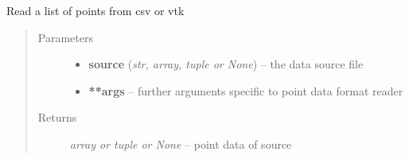 \documentclass[letterpaper,10pt,english]{sphinxmanual}
\begin{document}
\begin{fulllineitems}
\label{api/ClearMap.IO:ClearMap.IO.IO.readPoints}
Read a list of points from csv or vtk
\begin{quote}\begin{description}
\item[{Parameters}] \leavevmode\begin{itemize}
\item {} 
\textbf{source} (\emph{str, array, tuple or None}) --
the data source file

\item {} 
\textbf{**args} --
further arguments specific to point data format reader

\end{itemize}

\item[{Returns}] \leavevmode
\emph{array or tuple or None} --
point data of source

\end{description}\end{quote}




{\hyperref[api/ClearMap.IO:ClearMap.IO.IO.writePoints]{\emph{}}}



\end{fulllineitems}

\end{document}
